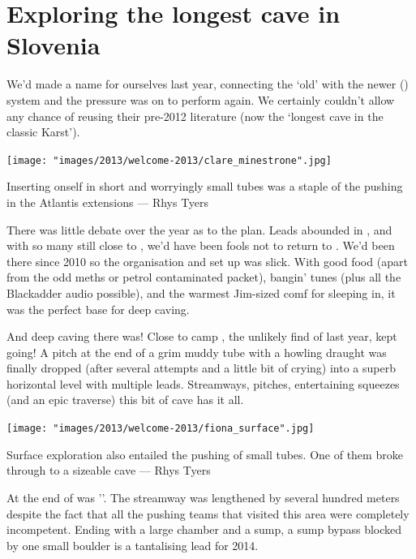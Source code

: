 
\section{Exploring the longest cave in Slovenia}

We’d made a name for ourselves last year, connecting the ‘old’  with the newer  () system and the pressure was on to perform again. We certainly couldn’t allow  any chance of reusing their pre-2012 literature (now the ‘longest cave in the classic Karst’). 

\begin{marginfigure}
\texttt{[image: "images/2013/welcome-2013/clare\_minestrone".jpg]}
\caption{Inserting onself in short and worryingly small tubes was a staple of the pushing in the Atlantis extensions --- Rhys Tyers}
\label{clare_minestrone}
\end{marginfigure}

There was little debate over the year as to the plan. Leads abounded in , and with so many still close to , we’d have been fools not to return to . We’d been there since 2010 so the organisation and set up was slick. With good food (apart from the odd meths or petrol contaminated packet), bangin’ tunes (plus all the Blackadder audio possible), and the warmest Jim-sized comf for sleeping in, it was the perfect base for deep caving.

And deep caving there was! Close to camp , the unlikely find of last year, kept going! A pitch at the end of a grim muddy tube with a howling draught was finally dropped (after several attempts and a little bit of crying) into a superb horizontal level with multiple leads. Streamways, pitches, entertaining squeezes (and an epic traverse) this bit of cave has it all.

\begin{marginfigure}
\texttt{[image: "images/2013/welcome-2013/fiona\_surface".jpg]}
\caption{Surface exploration also entailed the pushing of small tubes. One of them broke through to a sizeable cave --- Rhys Tyers}
\label{fiona_surface}
\end{marginfigure}

At the end of  was ''. The streamway was lengthened by several hundred meters despite the fact that all the pushing teams that visited this area were completely incompetent. Ending with a large chamber and a sump, a sump bypass blocked by one small boulder is a tantalising lead for 2014.

